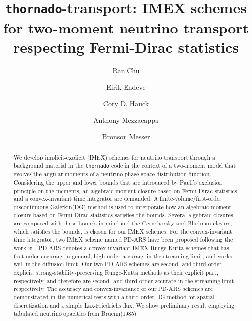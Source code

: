 \documentclass[a4paper]{jpconf}
\begin{document}
\title{\texttt{thornado}-transport: IMEX schemes for two-moment neutrino transport respecting Fermi-Dirac statistics}

\author{Ran Chu}
\address{Department of Physics and Astronomy, University of Tennessee Knoxville, TN 37996-1200}

\author{Eirik Endeve}
\address{Computational and Applied Mathematics Group, Oak Ridge National Laboratory, Oak Ridge, TN 37831 USA}
\address{Department of Physics and Astronomy, University of Tennessee Knoxville, TN 37996-1200}

\author{Cory D. Hauck}
\address{Computational and Applied Mathematics Group, Oak Ridge National Laboratory, Oak Ridge, TN 37831 USA}
\address{Department of Mathematics, University of Tennessee Knoxville, TN 37996-1320}

\author{Anthony Mezzacappa}
\address{Department of Physics and Astronomy, University of Tennessee Knoxville, TN 37996-1200}

\author{Bronson Messer}
\address{Scientific Computing and Theoretical Physics Groups, Oak Ridge National Laboratory, Oak Ridge, TN 37831 USA}
\address{Department of Physics and Astronomy, University of Tennessee Knoxville, TN 37996-1200}

\begin{abstract}
We develop implicit-explicit (IMEX) schemes for neutrino transport through a background material in the \texttt{thornado} code in the context of a two-moment model that evolves the angular moments of a neutrino phase-space distribution function.
Considering the upper and lower bounds that are introduced by Pauli's exclusion principle on the moments, an algebraic moment closure based on Fermi-Dirac statistics and a convex-invariant time integrator are demanded.
A finite-volume/first-order discontinuous Galerkin(DG) method is used to interporate how an algebraic moment closure based on Fermi-Dirac statistics satisfies the bounds.
Several algebraic closures are compared with these bounds in mind and the Cernohorsky and Bludman closure\cite{cernohorskyBludman_1994}, which satisfies the bounds, is chosen for our IMEX schemes.
For the convex-invariant time integrator, two IMEX scheme named PD-ARS have been proposed following the work in \cite{chu_etal_2018}.
PD-ARS denotes a convex-invariant IMEX Runge-Kutta schemes that has first-order accuracy in general, high-order accuracy in the streaming limit, and works well in the diffusion limit.
Our two PD-ARS schemes are second- and third-order, explicit, strong-stability-preserving Runge-Kutta methods\cite{gottlieb_etal_2001} as their explicit part, respectively, and therefore are second- and third-order accurate in the streaming limit, respectively.
The accuracy and convex-invariance of our PD-ARS schemes are demonstrated in the numerical tests with a third-order DG method for spatial discretization and a simple Lax-Friedrichs flux.
We show preliminary result employing tabulated neutrino opacities from Bruenn(1985)\citep{Bruenn_1985}

\end{abstract}
\end{document}
